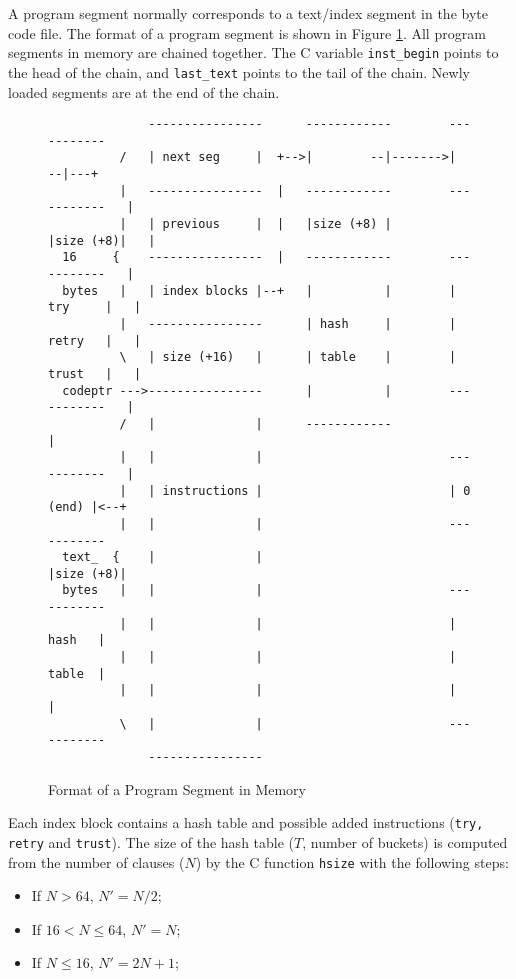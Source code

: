 \documentclass[11pt]{article}
\begin{document}
A program segment normally corresponds to a text/index segment in the 
byte code file.
The format of a program segment is shown in Figure \ref{f:programseg}.
All program segments in memory are chained together. The C variable
{\tt inst\_begin} points to the head of the chain, and 
{\tt last\_text} points to the tail of the chain. Newly loaded
segments are at the end of the chain.

\begin{figure}
\begin{verbatim}
              ----------------      ------------        -----------
          /   | next seg     |  +-->|        --|------->|       --|---+
          |   ----------------  |   ------------        -----------   |
          |   | previous     |  |   |size (+8) |        |size (+8)|   |
  16     {    ----------------  |   ------------        -----------   |
  bytes   |   | index blocks |--+   |          |        | try     |   |
          |   ----------------      | hash     |        | retry   |   |
          \   | size (+16)   |      | table    |        | trust   |   |
  codeptr --->----------------      |          |        -----------   |
          /   |              |      ------------                      |
          |   |              |                          -----------   |
          |   | instructions |                          | 0 (end) |<--+
          |   |              |                          -----------
  text_  {    |              |                          |size (+8)|
  bytes   |   |              |                          -----------
          |   |              |                          |  hash   |
          |   |              |                          |  table  |
          |   |              |                          |         |
          \   |              |                          -----------
              ----------------
\end{verbatim}
\caption{Format of a Program Segment in Memory}
\label{f:programseg}
\end{figure}

Each index block contains a hash table and possible added instructions
({\tt try, retry} and {\tt trust}). The size of the hash table
($T$, number of buckets) is computed from the number of clauses ($N$) by the C
function {\tt hsize} with the following steps:

\begin{itemize}
  \item If $N>64$, $N' = N/2$;
  \item If $16 < N \leq 64$, $N' = N$;
  \item If $N \leq 16$, $N' = 2N+1$;
\end{itemize}
\end{document}
